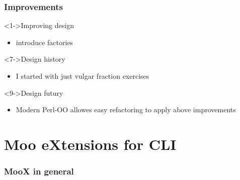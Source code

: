 \documentclass[ngerman,xcolor={table,dvipsnames},scriptsizeer,compress,hyperref={bookmarks,colorlinks}]{beamer}
\begin{document}
\section{Improvements}

\begin{frame}[t,fragile]

\begin{block}<1->{Improving design}
\begin{itemize}
\item introduce factories
\end{itemize}
\end{block}

\begin{block}<7->{Design history}
\begin{itemize}
\item I started with just vulgar fraction exercises
\end{itemize}
\end{block}

\begin{block}<9->{Design futury}
\begin{itemize}
\item Modern Perl-OO allowes easy refactoring to apply above improvements
\end{itemize}
\end{block}

\end{frame}

\part{Moo eXtensions for CLI}

\section{MooX in general}
\end{document}
